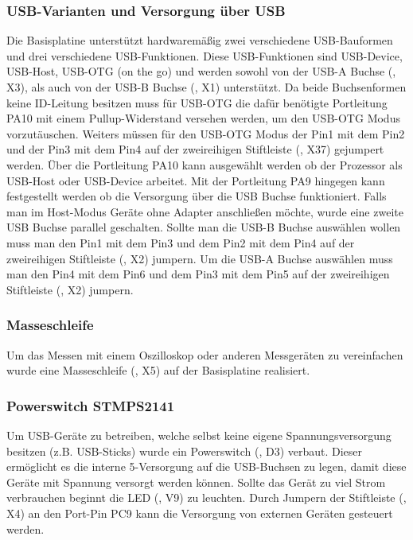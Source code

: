 \subsubsection{USB-Varianten und Versorgung über USB}
Die \gls{Basisplatine} unterstützt hardwaremäßig zwei verschiedene USB-Bauformen und drei verschiedene USB-Funktionen. Diese USB-Funktionen sind USB-Device, USB-Host, USB-OTG (on the go) und werden sowohl von der USB-A Buchse (, X3), als auch von der USB-B Buchse (, X1) unterstützt. Da beide Buchsenformen keine ID-Leitung besitzen muss für USB-OTG die dafür benötigte Portleitung PA10 mit einem Pullup-Widerstand versehen werden, um den USB-OTG Modus vorzutäuschen. Weiters müssen für den USB-OTG Modus der Pin1 mit dem Pin2 und der Pin3 mit dem Pin4 auf der zweireihigen Stiftleiste (, X37) gejumpert werden. Über die Portleitung PA10 kann ausgewählt werden ob der Prozessor als USB-Host oder USB-Device arbeitet. Mit der Portleitung PA9 hingegen kann festgestellt werden ob die Versorgung über die USB Buchse funktioniert. Falls man im Host-Modus Geräte ohne Adapter anschließen möchte, wurde eine zweite USB Buchse parallel geschalten.  Sollte man die USB-B Buchse auswählen wollen muss man den Pin1 mit dem Pin3 und dem Pin2 mit dem Pin4 auf der zweireihigen Stiftleiste (, X2) jumpern. Um die USB-A Buchse auswählen muss man den Pin4 mit dem Pin6 und dem Pin3 mit dem Pin5 auf der zweireihigen Stiftleiste (, X2) jumpern.


\subsubsection{Masseschleife}
Um das Messen mit einem Oszilloskop oder anderen Messgeräten zu vereinfachen wurde eine Masseschleife (, X5) auf der \gls{Basisplatine} realisiert.


\subsubsection{Powerswitch STMPS2141}
Um USB-Geräte zu betreiben, welche selbst keine eigene Spannungsversorgung besitzen (z.B. USB-Sticks) wurde ein Powerswitch (, D3) verbaut. Dieser ermöglicht es die interne \unit{5}{\volt}-Versorgung auf die USB-Buchsen zu legen, damit diese Geräte mit Spannung versorgt werden können. Sollte das Gerät zu viel Strom verbrauchen beginnt die LED (, V9) zu leuchten. Durch Jumpern der Stiftleiste (, X4) an den Port-Pin PC9 kann die Versorgung von externen Geräten gesteuert werden.

